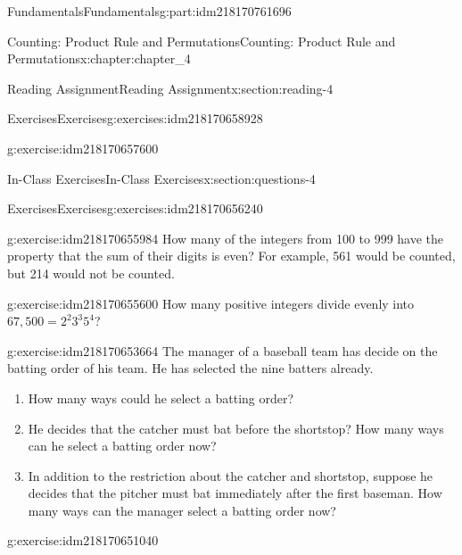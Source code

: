 \documentclass[oneside,10pt,]{book}
\numberwithin{equation}{section}
\begin{document}
\begin{partptx}{Fundamentals}{}{Fundamentals}{}{}{g:part:idm218170761696}
\begin{chapterptx}{Counting: Product Rule and Permutations}{}{Counting: Product Rule and Permutations}{}{}{x:chapter:chapter_4}
\begin{sectionptx}{Reading Assignment}{}{Reading Assignment}{}{}{x:section:reading-4}
\begin{exercises-subsection-numberless}{Exercises}{}{Exercises}{}{}{g:exercises:idm218170658928}
\begin{exercisegroup}
\begin{divisionexerciseeg}{2}{}{}{g:exercise:idm218170657600}
\end{divisionexerciseeg}%
\end{exercisegroup}
\par\medskip\noindent
\end{exercises-subsection-numberless}
\end{sectionptx}
%
%
\typeout{************************************************}
\typeout{************************************************}
%
\begin{sectionptx}{In-Class Exercises}{}{In-Class Exercises}{}{}{x:section:questions-4}
%
%
%
\typeout{************************************************}
\typeout{************************************************}
%
\begin{exercises-subsection-numberless}{Exercises}{}{Exercises}{}{}{g:exercises:idm218170656240}
\par\medskip\noindent%
%
\begin{exercisegroup}
\begin{divisionexerciseeg}{1}{}{}{g:exercise:idm218170655984}%
How many of the integers from 100 to 999 have the property that the sum of their digits is even? For example, 561 would be counted, but 214 would not be counted.%
\end{divisionexerciseeg}%
\begin{divisionexerciseeg}{2}{}{}{g:exercise:idm218170655600}%
How many positive integers divide evenly into \(67,500=2^2 3^3 5^4\)?%
\end{divisionexerciseeg}%
\begin{divisionexerciseeg}{3}{}{}{g:exercise:idm218170653664}%
The manager of a baseball team has decide on the batting order of his team.  He has selected the nine batters already.%
\begin{enumerate}[label=(\alph*)]
\item{}How many ways could he select a batting order?%
\item{}He decides that the catcher must bat before the shortstop?  How many ways can he select a batting order now?%
\item{}In addition to the restriction about the catcher and shortstop, suppose he decides that the pitcher must bat immediately after the first baseman.  How many ways can the manager select a batting order now?%
\end{enumerate}
%
\end{divisionexerciseeg}%
\begin{divisionexerciseeg}{4}{}{}{g:exercise:idm218170651040}%

\end{divisionexerciseeg}
\end{exercisegroup}
\end{exercises-subsection-numberless}
\end{sectionptx}
\end{chapterptx}
\end{partptx}
\end{document}
